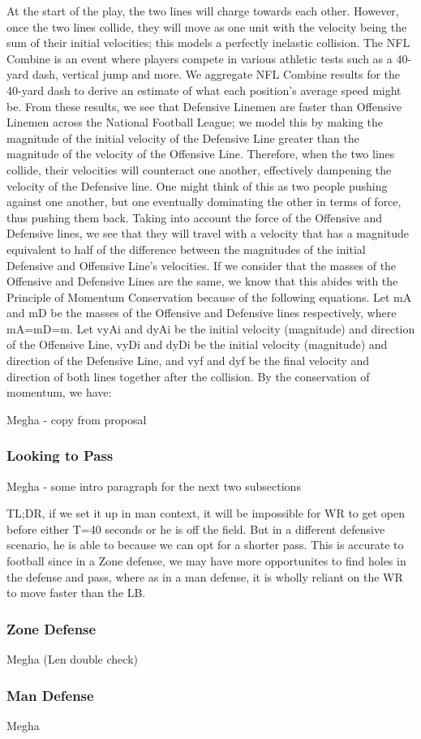 At the start of the play, the two lines will charge towards each other. However, once the two lines collide, they will move as one unit with the velocity being the sum of their initial velocities; this models a perfectly inelastic collision. The NFL Combine is an event where players compete in various athletic tests such as a 40-yard dash, vertical jump and more. We aggregate NFL Combine results for the 40-yard dash to derive an estimate of what each position's average speed might be. From these results, we see that Defensive Linemen are faster than Offensive Linemen across the National Football League; we model this by making the magnitude of the initial velocity of the Defensive Line greater than the magnitude of the velocity of the Offensive Line. Therefore, when the two lines collide, their velocities will counteract one another, effectively dampening the velocity of the Defensive line. One might think of this as two people pushing against one another, but one eventually dominating the other in terms of force, thus pushing them back.  Taking into account the force of the Offensive and Defensive lines, we see that they will travel with a velocity that has a magnitude equivalent to half of the difference between the magnitudes of the initial Defensive and Offensive Line’s velocities. If we consider that the masses of the Offensive and Defensive Lines are the same, we know that this abides with the Principle of Momentum Conservation because of the following equations. 
Let mA and mD be the masses of the Offensive and Defensive lines respectively, where mA=mD=m. Let vyAi and dyAi be the initial velocity (magnitude) and direction of the Offensive Line, vyDi and dyDi be the initial velocity (magnitude) and direction of the Defensive Line, and vyf and dyf be the final velocity and direction of both lines together after the collision. By the conservation of momentum, we have:

Megha - copy from proposal 

\subsubsection{Looking to Pass}

Megha -  some intro paragraph for the next two subsections
    
TL;DR, if we set it up in man context, it will be impossible for WR to get open before either T=40 seconds or he is off the field. But in a different defensive scenario, he is able to because we can opt for a shorter pass. This is accurate to football since in a Zone defense, we may have more opportunites to find holes in the defense and pass, where as in a man defense, it is wholly reliant on the WR to move faster than the LB.

\subsubsection{Zone Defense}

Megha (Len double check)

\subsubsection{Man Defense}

Megha 